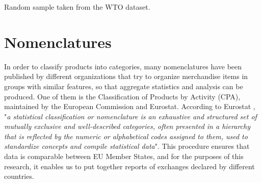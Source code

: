 \begin{table}
    \centering
    
    \caption{Random sample taken from the WTO dataset.}
    \label{tab:wtoexample}
\end{table}

\section{Nomenclatures}

In order to classify products into categories, many nomenclatures have been published by different organizations that try to organize merchandise items in groups with similar features, so that aggregate statistics and analysis can be produced. One of them is the Classification of Products by Activity (CPA), maintained by the European Commission and Eurostat.
According to Eurostat \cite{eurostat2022website}, "\textit{a statistical classification or nomenclature is an exhaustive and structured set of mutually exclusive and well-described categories, often presented in a hierarchy that is reflected by the numeric or alphabetical codes assigned to them, used to standardize concepts and compile statistical data}".
This procedure ensures that data is comparable between EU Member States, and for the purposes of this research, it enables us to put together reports of exchanges declared by different countries.


